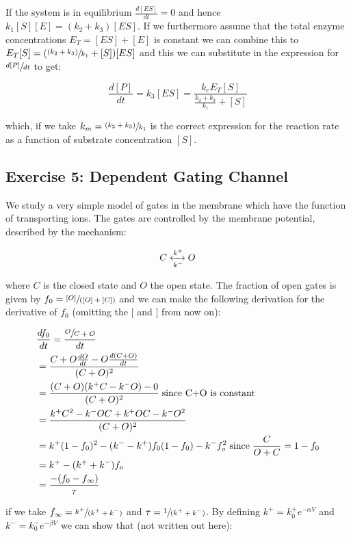 \documentclass[11pt,a4paper,onecolumn]{article}
\begin{document}
If the system is in equilibrium $\frac{d[ES]}{dt} = 0$ and hence $k_1 [S][E] = (k_2 + k_3)[ES]$. If we furthermore assume that the total enzyme concentrations $E_T = [ES] + [E]$ is constant we can combine this to $E_T [S] = (\sfrac{(k_2 + k_3)}{k_1} + [S])[ES]$ and this we can substitute in the expression for $\sfrac{d[P]}{dt}$ to get:

\begin{equation*}
    \frac{d[P]}{dt} = k_3 [ES] = \frac{k_e E_T [S]}{\frac{k_2 + k_3}{k_1} + [S]}
\end{equation*}

which, if we take $k_m = \sfrac{(k_2 + k_3)}{k_1}$ is the correct expression for the reaction rate as a function of substrate concentration $[S]$.

\subsection{Exercise 5: Dependent Gating Channel}
We study a very simple model of gates in the membrane which have the function of transporting ions. The gates are controlled by the membrane potential, described by the mechanism:

\begin{equation*}
  C \xleftrightarrow[k^-]{k^+} O
\end{equation*}

where $C$ is the closed state and $O$ the open state. The fraction of open gates is given by $f_0 = \sfrac{[O]}{([O]+[C])}$ and we can make the following derivation for the derivative of $f_0$ (omitting the $[$ and $]$ from now on):

\begin{align*}
  &\frac{df_0}{dt} = \frac{\sfrac{O}{C+O}}{dt} \nonumber \\
  &= \frac{C+O \frac{dO}{dt} - O \frac{d(C+O)}{dt}}{(C+O)^2} \nonumber \\
  &= \frac{(C+O)(k^+C - k^-O) - 0}{(C+O)^2} \; \text{since C+O is constant} \nonumber \\
  &= \frac{k^+C^2 - k^-OC + k^+OC - k^-O^2}{(C+O)^2} \nonumber \\
  &= k^+(1-f_0)^2 - (k^- - k^+)f_0(1-f_0) - k^-f_o^2 \; \text{since} \; \frac{C}{O+C} = 1 - f_0 \nonumber \\
  &= k^+ - (k^+ + k^-)f_o \nonumber \\
  &= \frac{-(f_0 - f_\infty)}{\tau}  
\end{align*}

if we take $f_{\infty} = \sfrac{k^+}{(k^+ + k^-)}$ and $\tau = \sfrac{1}{(k^+ + k^-)}$. By defining $k^+ = k_0^+ e^{-\alpha V}$ and $k^- = k_0^- e^{-\beta V}$ we can show that (not written out here):
\end{document}
